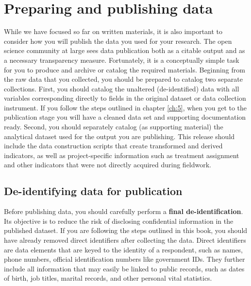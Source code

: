 
\section{Preparing and publishing data}

While we have focused so far on written materials,
it is also important to consider how you will publish
the data you used for your research.
The open science community at large sees data publication
both as a citable output and as a necessary transparency measure.
Fortunately, it is a conceptually simple task for you to produce
and archive or catalog the required materials.
Beginning from the raw data that you collected,
you should be prepared to catalog two separate collections.
First, you should catalog the unaltered (de-identified) data
with all variables corresponding directly
to fields in the original dataset or data collection instrument.
If you follow the steps outlined in chapter \ref{ch:5},
when you get to the publication stage you will have
a cleaned data set and supporting documentation ready.
Second, you should separately catalog (as supporting material)
the analytical dataset used for the output you are publishing.
This release should include the data construction scripts
that create transformed and derived indicators,
as well as project-specific information
such as treatment assignment and other indicators
that were not directly acquired during fieldwork.

\subsection{De-identifying data for publication}

Before publishing data,
you should carefully perform a \textbf{final de-identification}.
Its objective is to reduce the risk of disclosing confidential information in the published dataset.
If you are following the steps outlined in this book,
you should have already removed direct identifiers after collecting the data.
Direct identifiers are data elements that are keyed to the identity of a respondent,
such as names, phone numbers, official identification numbers like government IDs.
They further include all information that may easily be linked to public records,
such as dates of birth, job titles, marital records, and other personal vital statistics.

